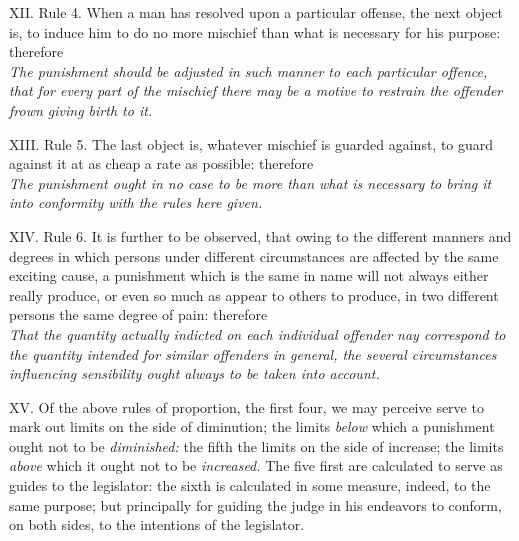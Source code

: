 \documentclass[12pt]{report}
\begin{document}
XII. Rule 4. When a man has resolved upon a particular offense, the next
object is, to induce him to do no more mischief than what is necessary
for his purpose: therefore\\
\emph{The punishment should be adjusted in such manner to each
particular offence, that for every part of the mischief there may be a
motive to restrain the offender frown giving birth to it.}

XIII. Rule 5. The last object is, whatever mischief is guarded against,
to guard against it at as cheap a rate as possible: therefore\\
\emph{The punishment ought in no case to be more than what is necessary
to bring it into conformity with the rules here given.}

XIV. Rule 6. It is further to be observed, that owing to the different
manners and degrees in which persons under different circumstances are
affected by the same exciting cause, a punishment which is the same in
name will not always either really produce, or even so much as appear to
others to produce, in two different persons the same degree of pain:
therefore\\
\emph{That the quantity actually indicted on each individual offender
nay correspond to the quantity intended for similar offenders in
general, the several circumstances influencing sensibility ought always
to be taken into account.}

XV. Of the above rules of proportion, the first four, we may perceive
serve to mark out limits on the side of diminution; the limits
\emph{below} which a punishment ought not to be \emph{diminished:} the
fifth the limits on the side of increase; the limits \emph{above} which
it ought not to be \emph{increased.} The five first are calculated to
serve as guides to the legislator: the sixth is calculated in some
measure, indeed, to the same purpose; but principally for guiding the
judge in his endeavors to conform, on both sides, to the intentions of
the legislator.
\end{document}
